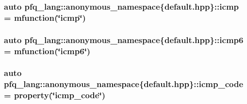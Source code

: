 \hypertarget{namespacepfq__lang_1_1anonymous__namespace_02default_8hpp_03_a180c8185595965a528fd2590da7dbeb9}{
\subsubsection[{icmp}]{\setlength{\rightskip}{0pt plus 5cm}auto pfq\+\_\+lang\+::anonymous\+\_\+namespace\{default.\+hpp\}\+::icmp = {\bf mfunction}(\char`\"{}icmp\char`\"{})}}\label{namespacepfq__lang_1_1anonymous__namespace_02default_8hpp_03_a180c8185595965a528fd2590da7dbeb9}
\hypertarget{namespacepfq__lang_1_1anonymous__namespace_02default_8hpp_03_ab1e01b177ae34e48f61eed78580aeac0}{
\subsubsection[{icmp6}]{\setlength{\rightskip}{0pt plus 5cm}auto pfq\+\_\+lang\+::anonymous\+\_\+namespace\{default.\+hpp\}\+::icmp6 = {\bf mfunction}(\char`\"{}icmp6\char`\"{})}}\label{namespacepfq__lang_1_1anonymous__namespace_02default_8hpp_03_ab1e01b177ae34e48f61eed78580aeac0}
\hypertarget{namespacepfq__lang_1_1anonymous__namespace_02default_8hpp_03_aad0f666aca065f5aaf283857e5c933ce}{
\subsubsection[{icmp\+\_\+code}]{\setlength{\rightskip}{0pt plus 5cm}auto pfq\+\_\+lang\+::anonymous\+\_\+namespace\{default.\+hpp\}\+::icmp\+\_\+code = {\bf property}(\char`\"{}icmp\+\_\+code\char`\"{})}}\label{namespacepfq__lang_1_1anonymous__namespace_02default_8hpp_03_aad0f666aca065f5aaf283857e5c933ce}
